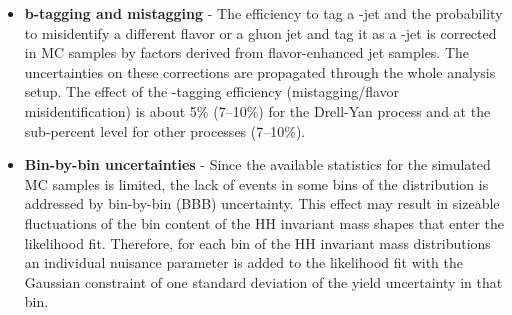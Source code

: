 \begin{itemize}
\item{\bfseries b-tagging and mistagging} - The efficiency to tag a \PQb-jet and the
  probability to misidentify a different flavor or a gluon jet and tag it as a
  \PQb-jet is corrected in MC samples by factors derived from
  flavor-enhanced jet samples. The uncertainties on these corrections
  are propagated through the whole analysis setup. The effect of the
  \PQb-tagging efficiency (mistagging/flavor misidentification) is about 5\% (7--10\%) for the Drell-Yan process and at the sub-percent level for other processes (7--10\%).

\item{\bfseries Bin-by-bin uncertainties} - Since the available statistics for the simulated MC samples is limited, the lack of events in some bins of the \mTHH distribution is addressed by bin-by-bin (BBB) uncertainty. This effect may result in sizeable fluctuations of the bin content of the HH invariant mass shapes that enter the
  likelihood fit. Therefore, for each bin of the HH invariant mass distributions
  an individual nuisance parameter is added to the likelihood fit with the Gaussian constraint of one standard deviation of
  the yield uncertainty in that bin.
  
\end{itemize}







